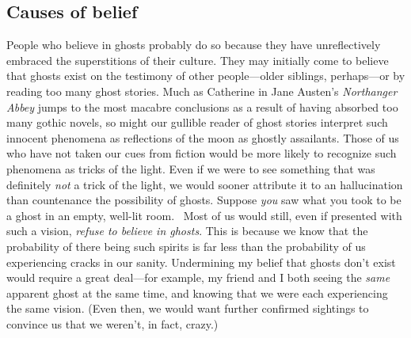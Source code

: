 \documentclass[11pt]{article}
\newenvironment{squote}{%
	\begin{spacing}{1}
	\begin{list}{}{%
	\setlength{\labelwidth}{0pt}%
	\rightmargin\leftmargin%
	}
	\item\relax
	}{%
	\end{list}%
	\end{spacing}
	}
\begin{document}
\begin{spacing}{1.5}
\subsection{Causes of belief}
\label{unger-cause}
People who believe in ghosts probably do so because they have unreflectively embraced the superstitions of their culture. They may initially come to believe that ghosts exist on the testimony of other people---older siblings, perhaps---or by reading too many ghost stories. Much as Catherine in Jane Austen's {\em Northanger Abbey} jumps to the most macabre conclusions as a result of having absorbed too many gothic novels, so might our gullible reader of ghost stories interpret such innocent phenomena as reflections of the moon as ghostly assailants. Those of us who have not taken our cues from fiction would be more likely to recognize such phenomena as tricks of the light. Even if we were to see something that was definitely {\em not} a trick of the light, we would sooner attribute it to an hallucination than countenance the possibility of ghosts. Suppose {\em you} saw what you took to be a ghost in an empty, well-lit room.%
%
%
\ Most of us would still, even if presented with such a vision, {\em refuse to believe in ghosts}. This is because we know that the probability of there being such spirits is far less than the probability of us experiencing cracks in our sanity. Undermining my belief that ghosts don't exist would require a great deal---for example, my friend and I both seeing the {\em same} apparent ghost at the same time, and knowing that we were each experiencing the same vision. (Even then, we would want further confirmed sightings to convince us that we weren't, in fact, crazy.)


\end{spacing}
\end{document}
